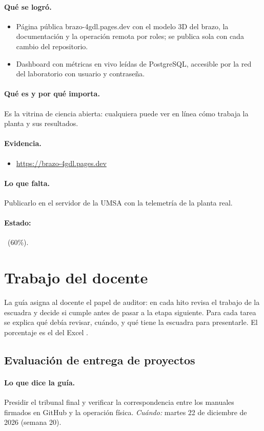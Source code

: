 \documentclass[a4paper,11pt]{article}
\begin{document}
\paragraph{Qué se logró.}
\begin{itemize}
\item Página pública brazo-4gdl.pages.dev con el modelo 3D del brazo, la documentación y la operación remota por roles; se publica sola con cada cambio del repositorio.
\item Dashboard con métricas en vivo leídas de PostgreSQL, accesible por la red del laboratorio con usuario y contraseña.
\end{itemize}
\paragraph{Qué es y por qué importa.} Es la vitrina de ciencia abierta: cualquiera puede ver en línea cómo trabaja la planta y sus resultados.
\paragraph{Evidencia.}
\begin{itemize}\small
\item \url{https://brazo-4gdl.pages.dev}
\end{itemize}
\paragraph{Lo que falta.} Publicarlo en el servidor de la UMSA con la telemetría de la planta real.
\paragraph{Estado:} \parcial~(60\%).
\section{Trabajo del docente}
La guía asigna al docente el papel de auditor: en cada hito revisa el trabajo de la escuadra y decide si cumple antes de pasar a la etapa siguiente. Para cada tarea se explica qué debía revisar, cuándo, y qué tiene la escuadra para presentarle. El porcentaje es el del Excel .
\subsection{Evaluación de entrega de proyectos}
\paragraph{Lo que dice la guía.} Presidir el tribunal final y verificar la correspondencia entre los manuales firmados en GitHub y la operación física. \textit{Cuándo:} martes 22 de diciembre de 2026 (semana 20).
\end{document}
